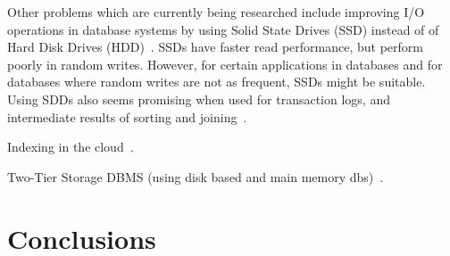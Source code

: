 \documentclass[12pt,a4paper]{article}
\begin{document}
Other problems which are currently being researched include improving I/O operations in database systems by using Solid State Drives (SSD) instead of of Hard
Disk Drives (HDD)~\cite{lee2009, du2009, lee2008}. SSDs have faster read performance, but perform poorly in random writes. However, for certain applications in
databases and for databases where random writes are not as frequent, SSDs might be suitable. Using SDDs also seems promising when used for
transaction logs, and intermediate results of sorting and joining~\cite{lee2008}.

Indexing in the cloud~\cite{wang2010indexing}.

Two-Tier Storage DBMS (using disk based and main memory dbs)~\cite{eo2008two}. 

\section{Conclusions}
\label{SEC-CONCL}

%









\end{document}
